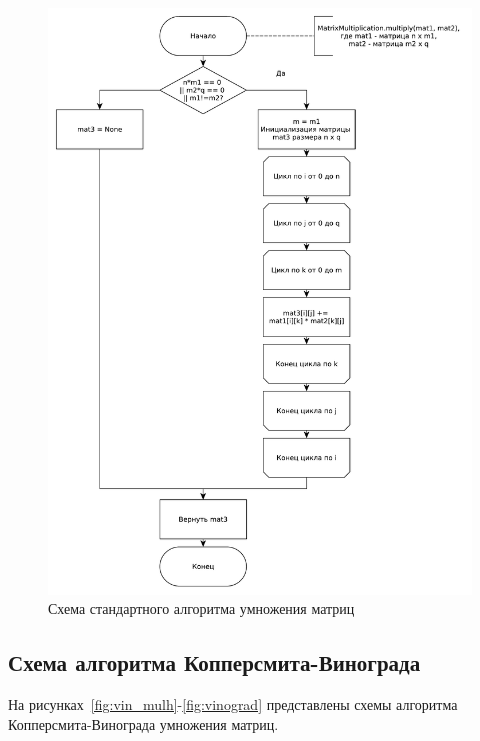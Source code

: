 \documentclass[12pt]{report}
\begin{document}
    \begin{figure}[H]
        \centering
        \includegraphics[width=0.85\linewidth]{img/MatrixMultiplication}
        \caption{
                Схема стандартного алгоритма умножения матриц
            }
        \label{fig:matmult}
    \end{figure}

    \subsection{Схема алгоритма Копперсмита-Винограда}
    На рисунках~\ref{fig:vin_mulh}-\ref{fig:vinograd} представлены схемы алгоритма Копперсмита-Винограда
    умножения матриц.
\end{document}
